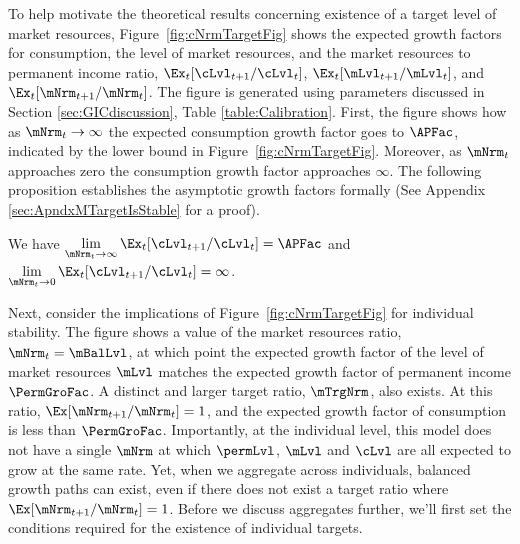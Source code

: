 \documentclass[BufferStockTheory]{subfiles}
\begin{document}
\begin{comment}
Should we say normalized market resources above?
\end{comment}

To help motivate the theoretical results concerning existence of a target level of market resources, Figure~\ref{fig:cNrmTargetFig} shows the expected growth factors for consumption, the level of market resources, and the market resources to permanent income ratio, $\Ex_{t}[\cLvl_{t+1}/\cLvl_{t}]$, $\Ex_{t}[\mLvl_{t+1}/\mLvl_{t}]$, and $\Ex_{t}[\mNrm_{t+1}/\mNrm_{t}]$. The figure is generated using parameters discussed in Section \ref{sec:GICdiscussion}, Table \ref{table:Calibration}. First, the figure shows how as $\mNrm_{t} \rightarrow \infty$ the expected consumption growth factor goes to ${\APFac}$, indicated by the lower bound in Figure~\ref{fig:cNrmTargetFig}.  Moreover, as $\mNrm_{t}$ approaches zero the consumption growth factor approaches $\infty$. The following proposition establishes the asymptotic growth factors formally (See Appendix \ref{sec:ApndxMTargetIsStable} for a proof).

\begin{proposition}\label{prop:convgGrowth}
We have $\lim\limits_{\mNrm_{t} \rightarrow \infty} \Ex_{t}[\cLvl_{t+1}/\cLvl_{t}] =  {\APFac}$ and $\lim\limits_{\mNrm_{t} \rightarrow  0} \Ex_{t}[\cLvl_{t+1}/\cLvl_{t}] =  \infty$. 
\end{proposition}

Next, consider the implications of Figure~\ref{fig:cNrmTargetFig} for individual stability. The figure shows a value of the market resources ratio, $\mNrm_{t} = \mBalLvl$, at which point the expected growth factor of the level of market resources $\mLvl$ matches the expected growth factor of permanent income $\PermGroFac$. A distinct and larger target ratio, $\mTrgNrm$, also exists. At this ratio, $\Ex[\mNrm_{t+1}/\mNrm_{t}]=1$, and the expected growth factor of consumption is less than $\PermGroFac$.  Importantly, at the individual level, this model does not have a single $\mNrm$ at which $\permLvl$, $\mLvl$ and $\cLvl$ are all expected to grow at the same rate. Yet, when we aggregate across individuals, balanced growth paths can exist, even if there does not exist a target ratio where $\Ex[\mNrm_{t+1}/\mNrm_{t}]=1$. Before we discuss aggregates further, we'll first set the conditions required for the existence of individual targets. 
\end{document}
